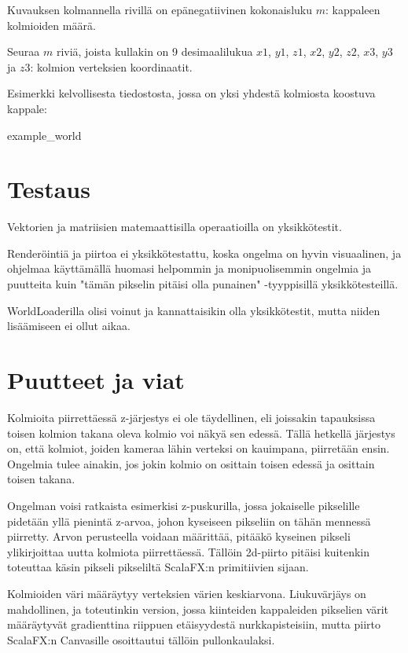 \documentclass[12pt] {article}
\begin{document}
Kuvauksen kolmannella rivillä on epänegatiivinen kokonaisluku $m$: kappaleen kolmioiden määrä.

Seuraa $m$ riviä, joista kullakin on 9 desimaalilukua $x1$, $y1$, $z1$, $x2$, $y2$, $z2$, $x3$, $y3$ ja $z3$: kolmion verteksien koordinaatit.

Esimerkki kelvollisesta tiedostosta, jossa on yksi yhdestä kolmiosta koostuva kappale:

 {example_world}

\section {Testaus}

Vektorien ja matriisien matemaattisilla operaatioilla on yksikkötestit.

Renderöintiä ja piirtoa ei yksikkötestattu, koska ongelma on hyvin visuaalinen, ja ohjelmaa käyttämällä huomasi helpommin ja monipuolisemmin ongelmia ja puutteita kuin "tämän pikselin pitäisi olla punainen" -tyyppisillä yksikkötesteillä.

WorldLoaderilla olisi voinut ja kannattaisikin olla yksikkötestit, mutta niiden lisäämiseen ei ollut aikaa.

\section {Puutteet ja viat}

Kolmioita piirrettäessä z-järjestys ei ole täydellinen, eli joissakin tapauksissa toisen kolmion takana oleva kolmio voi näkyä sen edessä. Tällä hetkellä järjestys on, että kolmiot, joiden kameraa lähin verteksi on kauimpana, piirretään ensin. Ongelmia tulee ainakin, jos jokin kolmio on osittain toisen edessä ja osittain toisen takana.

Ongelman voisi ratkaista esimerkisi z-puskurilla, jossa jokaiselle pikselille pidetään yllä pienintä z-arvoa, johon kyseiseen pikseliin on tähän mennessä piirretty. Arvon perusteella voidaan määrittää, pitääkö kyseinen pikseli ylikirjoittaa uutta kolmiota piirrettäessä. Tällöin 2d-piirto pitäisi kuitenkin toteuttaa käsin pikseli pikseliltä ScalaFX:n primitiivien sijaan.

Kolmioiden väri määräytyy verteksien värien keskiarvona. Liukuvärjäys on mahdollinen, ja toteutinkin version, jossa kiinteiden kappaleiden pikselien värit määräytyvät gradienttina riippuen etäisyydestä nurkkapisteisiin, mutta piirto ScalaFX:n Canvasille osoittautui tällöin pullonkaulaksi.
\end{document}
